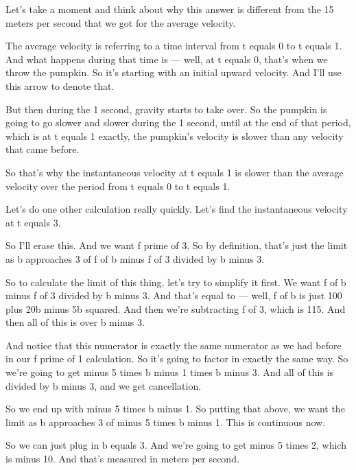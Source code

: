 \documentclass[pdftex, brazil, 12pt, twoside]{article}
\begin{document}
Let's take a moment and think about why this answer is
different from the 15 meters per second
that we got for the average velocity.

The average velocity is referring to a time interval
from t equals 0 to t equals 1.
And what happens during that time is --- well,
at t equals 0, that's when we throw the pumpkin.
So it's starting with an initial upward velocity.
And I'll use this arrow to denote that.

But then during the 1 second, gravity starts to take over.
So the pumpkin is going to go slower and slower during the 1
second, until at the end of that period, which
is at t equals 1 exactly, the pumpkin's velocity is
slower than any velocity that came before.

So that's why the instantaneous velocity at t
equals 1 is slower than the average velocity
over the period from t equals 0 to t equals 1.

Let's do one other calculation really quickly.
Let's find the instantaneous velocity at t equals 3.

So I'll erase this.
And we want f prime of 3.
So by definition, that's just the limit
as b approaches 3 of f of b minus f of 3
divided by b minus 3.

So to calculate the limit of this thing,
let's try to simplify it first.
We want f of b minus f of 3 divided by b minus 3.
And that's equal to --- well, f of b is just 100
plus 20b minus 5b squared.
And then we're subtracting f of 3, which is 115.
And then all of this is over b minus 3.

And notice that this numerator is exactly the same numerator
as we had before in our f prime of 1 calculation.
So it's going to factor in exactly the same way.
So we're going to get minus 5 times b minus 1 times b
minus 3.
And all of this is divided by b minus 3,
and we get cancellation.

So we end up with minus 5 times b minus 1.
So putting that above, we want the limit
as b approaches 3 of minus 5 times b minus 1.
This is continuous now.

So we can just plug in b equals 3.
And we're going to get minus 5 times 2, which is minus 10.
And that's measured in meters per second.

\begin{figure}[H]
  \begin{center}
    \label{fig:derivative-at-point-3}
  \end{center}
\end{figure}
\end{document}
